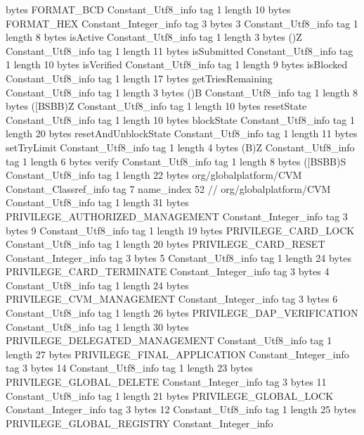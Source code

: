 {{{			bytes	FORMAT_BCD
		}
		Constant_Utf8_info {
			tag	1
			length	10
			bytes	FORMAT_HEX
		}
		Constant_Integer_info {
			tag	3
			bytes	3
		}
		Constant_Utf8_info {
			tag	1
			length	8
			bytes	isActive
		}
		Constant_Utf8_info {
			tag	1
			length	3
			bytes	()Z
		}
		Constant_Utf8_info {
			tag	1
			length	11
			bytes	isSubmitted
		}
		Constant_Utf8_info {
			tag	1
			length	10
			bytes	isVerified
		}
		Constant_Utf8_info {
			tag	1
			length	9
			bytes	isBlocked
		}
		Constant_Utf8_info {
			tag	1
			length	17
			bytes	getTriesRemaining
		}
		Constant_Utf8_info {
			tag	1
			length	3
			bytes	()B
		}
		Constant_Utf8_info {
			tag	1
			length	8
			bytes	([BSBB)Z
		}
		Constant_Utf8_info {
			tag	1
			length	10
			bytes	resetState
		}
		Constant_Utf8_info {
			tag	1
			length	10
			bytes	blockState
		}
		Constant_Utf8_info {
			tag	1
			length	20
			bytes	resetAndUnblockState
		}
		Constant_Utf8_info {
			tag	1
			length	11
			bytes	setTryLimit
		}
		Constant_Utf8_info {
			tag	1
			length	4
			bytes	(B)Z
		}
		Constant_Utf8_info {
			tag	1
			length	6
			bytes	verify
		}
		Constant_Utf8_info {
			tag	1
			length	8
			bytes	([BSBB)S
		}
		Constant_Utf8_info {
			tag	1
			length	22
			bytes	org/globalplatform/CVM
		}
		Constant_Classref_info {
			tag	7
			name_index	52		// org/globalplatform/CVM
		}
		Constant_Utf8_info {
			tag	1
			length	31
			bytes	PRIVILEGE_AUTHORIZED_MANAGEMENT
		}
		Constant_Integer_info {
			tag	3
			bytes	9
		}
		Constant_Utf8_info {
			tag	1
			length	19
			bytes	PRIVILEGE_CARD_LOCK
		}
		Constant_Utf8_info {
			tag	1
			length	20
			bytes	PRIVILEGE_CARD_RESET
		}
		Constant_Integer_info {
			tag	3
			bytes	5
		}
		Constant_Utf8_info {
			tag	1
			length	24
			bytes	PRIVILEGE_CARD_TERMINATE
		}
		Constant_Integer_info {
			tag	3
			bytes	4
		}
		Constant_Utf8_info {
			tag	1
			length	24
			bytes	PRIVILEGE_CVM_MANAGEMENT
		}
		Constant_Integer_info {
			tag	3
			bytes	6
		}
		Constant_Utf8_info {
			tag	1
			length	26
			bytes	PRIVILEGE_DAP_VERIFICATION
		}
		Constant_Utf8_info {
			tag	1
			length	30
			bytes	PRIVILEGE_DELEGATED_MANAGEMENT
		}
		Constant_Utf8_info {
			tag	1
			length	27
			bytes	PRIVILEGE_FINAL_APPLICATION
		}
		Constant_Integer_info {
			tag	3
			bytes	14
		}
		Constant_Utf8_info {
			tag	1
			length	23
			bytes	PRIVILEGE_GLOBAL_DELETE
		}
		Constant_Integer_info {
			tag	3
			bytes	11
		}
		Constant_Utf8_info {
			tag	1
			length	21
			bytes	PRIVILEGE_GLOBAL_LOCK
		}
		Constant_Integer_info {
			tag	3
			bytes	12
		}
		Constant_Utf8_info {
			tag	1
			length	25
			bytes	PRIVILEGE_GLOBAL_REGISTRY
		}
		Constant_Integer_info {
}}}
